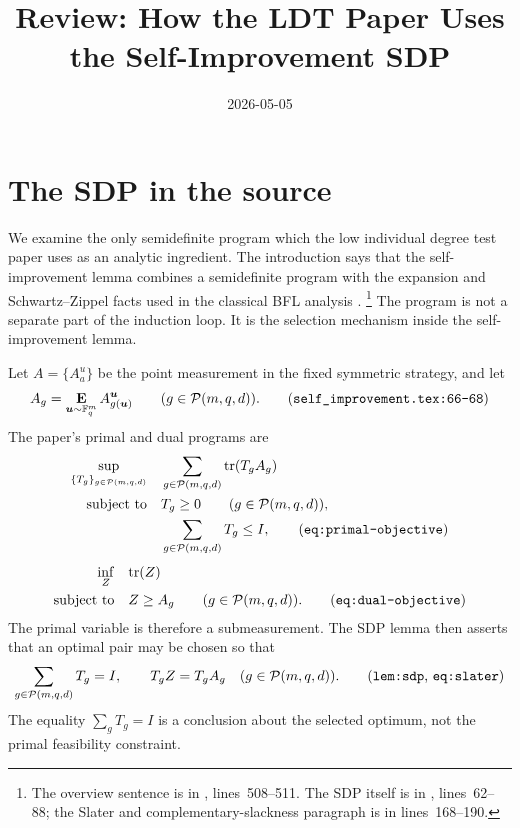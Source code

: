\documentclass[11pt]{article}
\title{Review: How the LDT Paper Uses the Self-Improvement SDP}
\author{}
\date{2026-05-05}
\begin{document}
\maketitle

\section{The SDP in the source}

We examine the only semidefinite program which the low individual degree test
paper uses as an analytic ingredient.  The introduction says that the
self-improvement lemma combines a semidefinite program with the expansion and
Schwartz--Zippel facts used in the classical BFL analysis
\cite[Introduction]{Ji2020LowIndividualDegree}.%
\footnote{The overview sentence is in
, lines~508--511.  The SDP itself
is in , lines~62--88; the
Slater and complementary-slackness paragraph is in lines~168--190.}
The program is not a separate part of the induction loop.  It is the selection
mechanism inside the self-improvement lemma.

Let $A=\{A^u_a\}$ be the point measurement in the fixed symmetric strategy, and
let
\[
  A_g = \E_{\bu\sim\F_q^m} A^{\bu}_{g(\bu)}
  \qquad (g\in \polyfunc{m}{q}{d}).
  \tag{\texttt{self\_improvement.tex:66--68}}
\]
The paper's primal and dual programs are
\begin{align}
  \sup_{\{T_g\}_{g\in\polyfunc{m}{q}{d}}}
    &\quad \sum_{g\in\polyfunc{m}{q}{d}} \tr(T_g A_g) \\
  \text{subject to}
    &\quad T_g\ge 0 \qquad(g\in\polyfunc{m}{q}{d}), \notag\\
    &\quad \sum_{g\in\polyfunc{m}{q}{d}} T_g\le I, \notag
  \tag{\texttt{eq:primal-objective}}
\end{align}
\begin{align}
  \inf_Z
    &\quad \tr(Z) \\
  \text{subject to}
    &\quad Z\ge A_g \qquad(g\in\polyfunc{m}{q}{d}). \notag
  \tag{\texttt{eq:dual-objective}}
\end{align}
The primal variable is therefore a submeasurement.  The SDP lemma then asserts
that an optimal pair may be chosen so that
\[
  \sum_{g\in\polyfunc{m}{q}{d}} T_g = I,
  \qquad
  T_g Z = T_g A_g \quad(g\in\polyfunc{m}{q}{d}).
  \tag{\texttt{lem:sdp}, \texttt{eq:slater}}
\]
The equality $\sum_g T_g=I$ is a conclusion about the selected optimum, not the
primal feasibility constraint.
\end{document}
